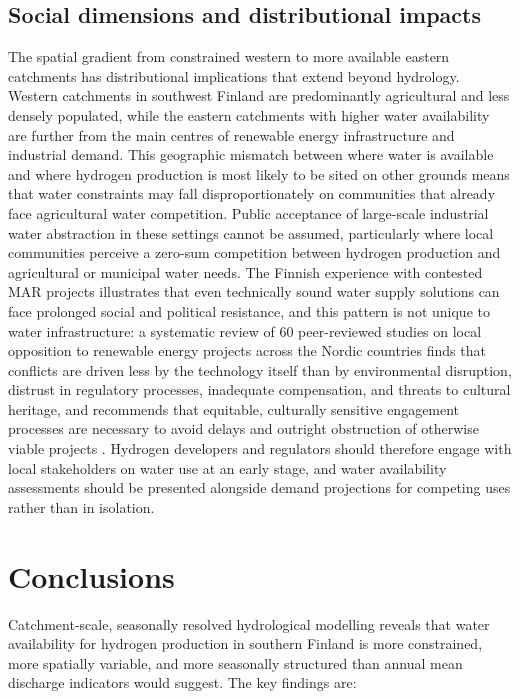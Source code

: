 \documentclass[draft]{agujournal2019}
\begin{document}
\subsection{Social dimensions and distributional impacts}
The spatial gradient from constrained western to more available eastern catchments has distributional implications that extend beyond hydrology. Western catchments in southwest Finland are predominantly agricultural and less densely populated, while the eastern catchments with higher water availability are further from the main centres of renewable energy infrastructure and industrial demand. This geographic mismatch between where water is available and where hydrogen production is most likely to be sited on other grounds means that water constraints may fall disproportionately on communities that already face agricultural water competition. Public acceptance of large-scale industrial water abstraction in these settings cannot be assumed, particularly where local communities perceive a zero-sum competition between hydrogen production and agricultural or municipal water needs. The Finnish experience with contested MAR projects \cite{laukka2021creating} illustrates that even technically sound water supply solutions can face prolonged social and political resistance, and this pattern is not unique to water infrastructure: a systematic review of 60 peer-reviewed studies on local opposition to renewable energy projects across the Nordic countries finds that conflicts are driven less by the technology itself than by environmental disruption, distrust in regulatory processes, inadequate compensation, and threats to cultural heritage, and recommends that equitable, culturally sensitive engagement processes are necessary to avoid delays and outright obstruction of otherwise viable projects \cite{SanchezNieminen2025}. Hydrogen developers and regulators should therefore engage with local stakeholders on water use at an early stage, and water availability assessments should be presented alongside demand projections for competing uses rather than in isolation.

\section{Conclusions}

Catchment-scale, seasonally resolved hydrological modelling reveals that water availability for hydrogen production in southern Finland is more constrained, more spatially variable, and more seasonally structured than annual mean discharge indicators would suggest. The key findings are:
\end{document}
